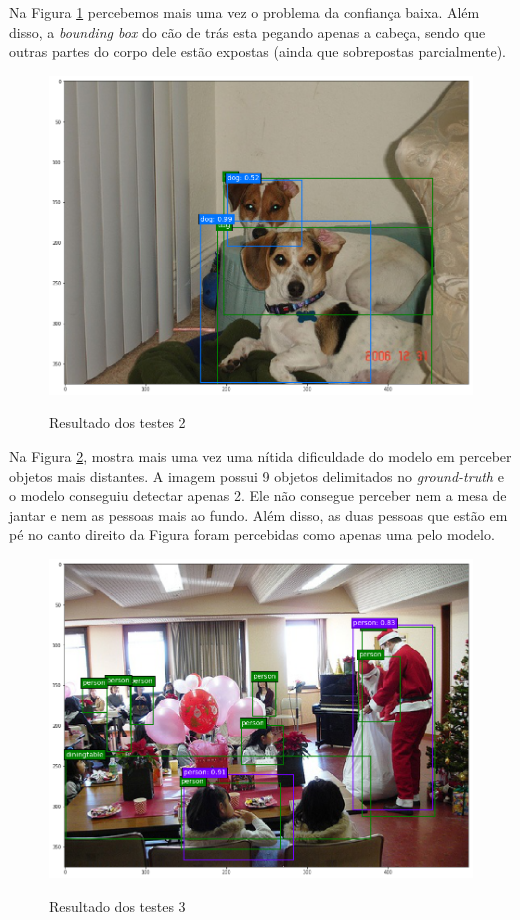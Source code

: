 Na Figura \ref{fig:teste_2} percebemos mais uma vez o problema da confiança baixa. Além disso, a \textit{bounding box} do cão de trás esta pegando apenas a cabeça, sendo que outras partes do corpo dele estão expostas (ainda que sobrepostas parcialmente).

\begin{figure}[H]
	\setlength{\abovecaptionskip}{0pt}
	\setlength{\belowcaptionskip}{0pt}
	\caption[Resultado dos testes 2]{Resultado dos testes 2}
	\centering
	\includegraphics[width=.6\textwidth]{imagem/test_image_3.png}
	\captionsetup{justification=centering}
	\label{fig:teste_2}
\end{figure}

Na Figura \ref{fig:teste_3}, mostra mais uma vez uma nítida dificuldade do modelo em perceber objetos mais distantes. A imagem possui 9 objetos delimitados no \textit{ground-truth} e o modelo conseguiu detectar apenas 2. Ele não consegue perceber nem a mesa de jantar e nem as pessoas mais ao fundo. Além disso, as duas pessoas que estão em pé no canto direito da Figura foram percebidas como apenas uma pelo modelo.

\begin{figure}[H]
	\setlength{\abovecaptionskip}{0pt}
	\setlength{\belowcaptionskip}{0pt}
	\caption[Resultado dos testes 3]{Resultado dos testes 3}
	\centering
	\includegraphics[width=.6\textwidth]{imagem/test_image_1.png}
	\captionsetup{justification=centering}
	\label{fig:teste_3}
\end{figure}

